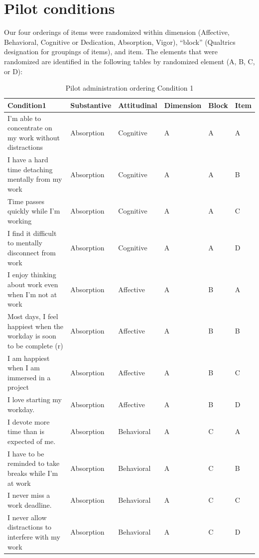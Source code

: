 \documentclass[
]{book}
\begin{document}
\hypertarget{pilot2}{%
\chapter{Pilot conditions}\label{pilot2}}

Our four orderings of items were randomized within dimension (Affective, Behavioral, Cognitive or Dedication, Absorption, Vigor), ``block'' (Qualtrics designation for groupings of items), and item. The elements that were randomized are identified in the following tables by randomized element (A, B, C, or D):

\begin{table}

\caption{\label{tab:conditions}Pilot administration ordering Condition 1}
\centering
\begin{tabular}[t]{l|l|l|l|l|l}
\hline
Condition1 & Substantive & Attitudinal & Dimension & Block & Item\\
\hline
I’m able to concentrate on my work without distractions & Absorption & Cognitive & A & A & A\\
\hline
I have a hard time detaching mentally from my work & Absorption & Cognitive & A & A & B\\
\hline
Time passes quickly while I’m working & Absorption & Cognitive & A & A & C\\
\hline
I find it difficult to mentally disconnect from work & Absorption & Cognitive & A & A & D\\
\hline
I enjoy thinking about work even when I’m not at work & Absorption & Affective & A & B & A\\
\hline
Most days, I feel happiest when the workday is soon to be complete (r) & Absorption & Affective & A & B & B\\
\hline
I am happiest when I am immersed in a project & Absorption & Affective & A & B & C\\
\hline
I love starting my workday. & Absorption & Affective & A & B & D\\
\hline
I devote more time than is expected of me. & Absorption & Behavioral & A & C & A\\
\hline
I have to be reminded to take breaks while I’m at work & Absorption & Behavioral & A & C & B\\
\hline
I never miss a work deadline. & Absorption & Behavioral & A & C & C\\
\hline
I never allow distractions to interfere with my work & Absorption & Behavioral & A & C & D\\
\hline

\end{tabular}
\end{table}
\end{document}
